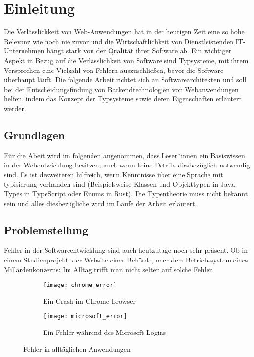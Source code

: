 \section{Einleitung} 

Die Verlässlichkeit von Web-Anwendungen hat in der heutigen Zeit eine so hohe Relevanz wie noch
nie zuvor und die Wirtschaftlichkeit von Dienstleistenden IT-Unternehmen hängt stark von der Qualität ihrer Software ab.
Ein wichtiger Aspekt in Bezug auf die Verlässlichkeit von Software sind Typsysteme, mit ihrem Versprechen eine Vielzahl
von Fehlern auszuschließen, bevor die Software überhaupt läuft.
Die folgende Arbeit richtet sich an Softwarearchitekten und soll bei der Entscheidungsfindung von Backendtechnologien 
von Webanwendungen helfen, indem das Konzept der Typsysteme sowie deren Eigenschaften erläutert werden.


\subsection{Grundlagen} 

Für die Abeit wird im folgenden angenommen, dass Leser*innen ein Basiswissen in der Webentwicklung besitzen,
auch wenn keine Details diesbezüglich notwendig sind.
Es ist desweiteren hilfreich, wenn Kenntnisse über eine Sprache mit typisierung vorhanden sind
(Beispielsweise Klassen und Objekttypen in Java, Types in TypeScript oder Enums in Rust).
Die Typentheorie muss nicht bekannt sein und alles diesbezügliche wird im Laufe der Arbeit erläutert.

\subsection{Problemstellung} 

Fehler in der Softwareentwicklung sind auch heutzutage noch sehr präsent. Ob in einem Studienprojekt, der Website einer Behörde,
oder dem Betriebssystem eines Millardenkonzerns: Im Alltag trifft man nicht selten auf solche Fehler.

\begin{figure}[H]
  \centering
  \begin{subfigure}[b]{0.4\linewidth}
    \texttt{[image: chrome\_error]}
    \caption{Ein Crash im Chrome-Browser}
  \end{subfigure}
  \hspace{0.5cm}
  \begin{subfigure}[b]{0.4\linewidth}
    \texttt{[image: microsoft\_error]}
    \caption{Ein Fehler während des Microsoft Logins}
  \end{subfigure}
  \caption{Fehler in alltäglichen Anwendungen}
\end{figure}


